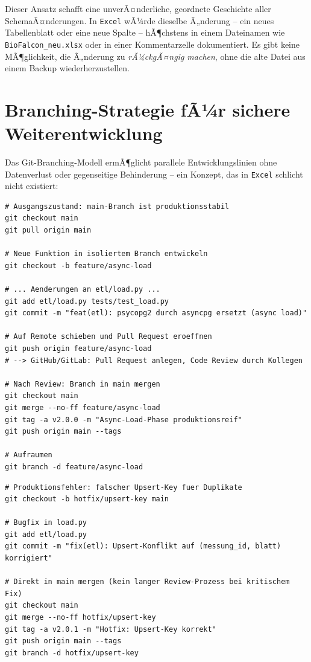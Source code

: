 ﻿\documentclass[12pt,a4paper]{report}
\theoremstyle{definition}
\theoremstyle{remark}
\newcommand{\excel}{\texttt{Excel}}
\newcommand{\code}[1]{\texttt{#1}}
\begin{document}
Dieser Ansatz schafft eine unverÃ¤nderliche, geordnete Geschichte aller
SchemaÃ¤nderungen. In \excel{} wÃ¼rde dieselbe Ã„nderung -- ein neues
Tabellenblatt oder eine neue Spalte -- hÃ¶chstens in einem
Dateinamen wie \code{BioFalcon\_neu.xlsx} oder in einer
Kommentarzelle dokumentiert. Es gibt keine MÃ¶glichkeit,
die Ã„nderung zu \emph{rÃ¼ckgÃ¤ngig machen}, ohne die alte Datei
aus einem Backup wiederherzustellen.

\section{Branching-Strategie fÃ¼r sichere Weiterentwicklung}

Das Git-Branching-Modell ermÃ¶glicht parallele Entwicklungslinien ohne
Datenverlust oder gegenseitige Behinderung -- ein Konzept, das in
\excel{} schlicht nicht existiert:

\begin{lstlisting}[style=bash, caption={Feature-Branch-Workflow (GitHub Flow)}]
# Ausgangszustand: main-Branch ist produktionsstabil
git checkout main
git pull origin main

# Neue Funktion in isoliertem Branch entwickeln
git checkout -b feature/async-load

# ... Aenderungen an etl/load.py ...
git add etl/load.py tests/test_load.py
git commit -m "feat(etl): psycopg2 durch asyncpg ersetzt (async load)"

# Auf Remote schieben und Pull Request eroeffnen
git push origin feature/async-load
# --> GitHub/GitLab: Pull Request anlegen, Code Review durch Kollegen

# Nach Review: Branch in main mergen
git checkout main
git merge --no-ff feature/async-load
git tag -a v2.0.0 -m "Async-Load-Phase produktionsreif"
git push origin main --tags

# Aufraumen
git branch -d feature/async-load
\end{lstlisting}

\begin{lstlisting}[style=bash, caption={Hotfix: Kritischen Bug in Produktion beheben}]
# Produktionsfehler: falscher Upsert-Key fuer Duplikate
git checkout -b hotfix/upsert-key main

# Bugfix in load.py
git add etl/load.py
git commit -m "fix(etl): Upsert-Konflikt auf (messung_id, blatt) korrigiert"

# Direkt in main mergen (kein langer Review-Prozess bei kritischem Fix)
git checkout main
git merge --no-ff hotfix/upsert-key
git tag -a v2.0.1 -m "Hotfix: Upsert-Key korrekt"
git push origin main --tags
git branch -d hotfix/upsert-key
\end{lstlisting}
\end{document}
